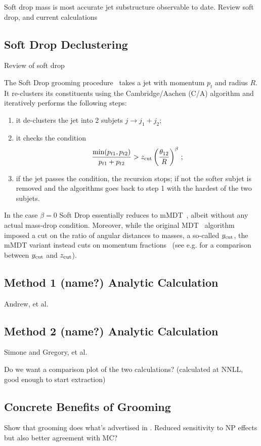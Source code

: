 
Soft drop mass is most accurate jet substructure observable to date.  Review soft drop, and current calculations

\subsection{Soft Drop Declustering}

Review of soft drop


The Soft Drop grooming procedure~\cite{Larkoski:2014wba} takes a jet
with momentum $p_t$ and radius $R$. It re-clusters its constituents
using the Cambridge/Aachen (C/A) algorithm \cite{Dokshitzer:1997in,
  Wobisch:1998wt} and iteratively performs the following steps:
\begin{enumerate}
 \item it de-clusters the jet into 2 subjets $j \to j_1 + j_2$;
 \item it checks the condition 
\begin{equation}\label{eq:sd-condition}
\frac{\min (p_{t1} , p_{t2})}{p_{t1}+p_{t2}} > z_{\rm cut} \left(
  \frac{\theta_{12}}{R}\right)^\beta\,;
\end{equation}
\item if the jet passes the condition, the recursion stops; if not the
  softer subjet is removed and the algorithms goes back to step 1 with
  the hardest of the two subjets. 
 \end{enumerate}
In the case $\beta=0$ Soft Drop essentially reduces to mMDT~\cite{Dasgupta:2013ihk},
 albeit without any actual mass-drop condition. Moreover, while the
 original MDT~\cite{Butterworth:2008iy} algorithm imposed a cut on the ratio of angular distances
 to masses, a so-called $y_{\rm cut}$, the mMDT variant instead cuts on
 momentum fractions~\cite{Dasgupta:2013ihk} (see
 e.g. \cite{Dasgupta:2013ihk,Dasgupta:2016ktv} for a comparison
 between $y_{\rm cut}$ and $z_{\rm cut}$).

\subsection{Method 1 (name?) Analytic Calculation}

Andrew, et al.

\subsection{Method 2 (name?)  Analytic Calculation}

Simone and Gregory, et al.

Do we want a comparison plot of the two calculations?
(calculated at NNLL, good enough to start extraction)

\subsection{Concrete Benefits of Grooming}

Show that grooming does what's advertised in .
Reduced sensitivity to NP effects but also better agreement with MC? 